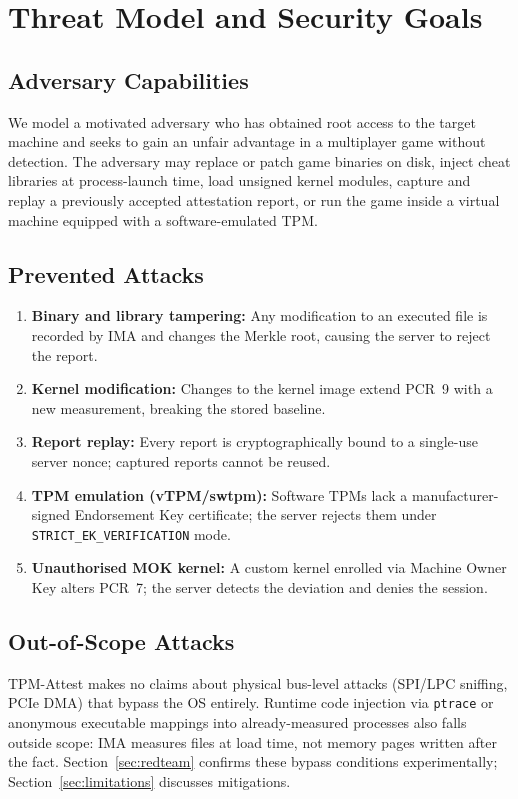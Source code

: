 \documentclass[11pt]{article}
\begin{document}
\section{Threat Model and Security Goals}
\label{sec:threat-model}

\subsection{Adversary Capabilities}
We model a motivated adversary who has obtained root access to the target machine and seeks to gain an unfair advantage in a multiplayer game without detection. The adversary may replace or patch game binaries on disk, inject cheat libraries at process-launch time, load unsigned kernel modules, capture and replay a previously accepted attestation report, or run the game inside a virtual machine equipped with a software-emulated TPM.

\subsection{Prevented Attacks}
\begin{enumerate}[nosep]
  \item \textbf{Binary and library tampering:} Any modification to an executed file is recorded by IMA and changes the Merkle root, causing the server to reject the report.
  \item \textbf{Kernel modification:} Changes to the kernel image extend PCR~9 with a new measurement, breaking the stored baseline.
  \item \textbf{Report replay:} Every report is cryptographically bound to a single-use server nonce; captured reports cannot be reused.
  \item \textbf{TPM emulation (vTPM/swtpm):} Software TPMs lack a manufacturer-signed Endorsement Key certificate; the server rejects them under \texttt{STRICT\_EK\_VERIFICATION} mode.
  \item \textbf{Unauthorised MOK kernel:} A custom kernel enrolled via Machine Owner Key alters PCR~7; the server detects the deviation and denies the session.
\end{enumerate}

\subsection{Out-of-Scope Attacks}
TPM-Attest makes no claims about physical bus-level attacks (SPI/LPC sniffing, PCIe DMA) that bypass the OS entirely. Runtime code injection via \texttt{ptrace} or anonymous executable mappings into already-measured processes also falls outside scope: IMA measures files at load time, not memory pages written after the fact. Section~\ref{sec:redteam} confirms these bypass conditions experimentally; Section~\ref{sec:limitations} discusses mitigations.
\end{document}

